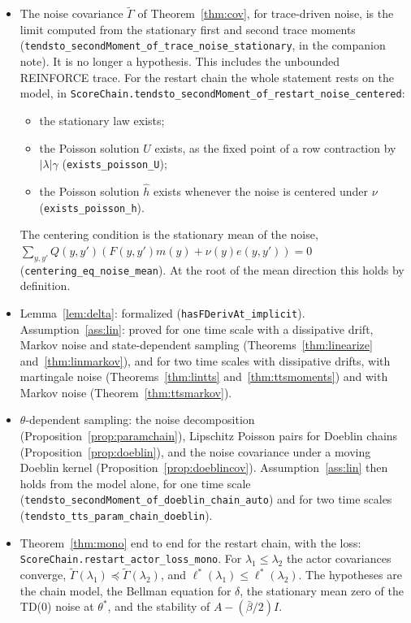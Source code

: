 \documentclass[11pt]{article}
\theoremstyle{definition}
\theoremstyle{remark}
\begin{document}
\begin{itemize}
  $|\lambda| \le 1$.
\item The noise covariance $\tilde\Gamma$ of Theorem~\ref{thm:cov}, for trace-driven noise, is the limit
  computed from the stationary first and second trace moments
  (\texttt{tendsto\_secondMoment\_of\_trace\_noise\_stationary}, in the companion note). It is no
  longer a hypothesis. This includes the unbounded REINFORCE trace. For the restart chain the
  whole statement rests on the model, in
  \texttt{ScoreChain.tendsto\_secondMoment\_of\_restart\_noise\_centered}:
  \begin{itemize}
  \item the stationary law exists;
  \item the Poisson solution $U$ exists, as the fixed point of a row contraction by $|\lambda|\gamma$
    (\texttt{exists\_poisson\_U});
  \item the Poisson solution $\hat h$ exists whenever the noise is centered under $\nu$
    (\texttt{exists\_poisson\_h}).
  \end{itemize}
  The centering condition is the stationary mean of the noise,
  $\sum_{y,y'}Q(y,y')(F(y,y')m(y) + \nu(y)e(y,y')) = 0$ (\texttt{centering\_eq\_noise\_mean}).
  At the root of the mean direction this holds by definition.
\item Lemma~\ref{lem:delta}: formalized (\texttt{hasFDerivAt\_implicit}). Assumption~\ref{ass:lin}:
  proved for one time scale with a dissipative drift, Markov noise and state-dependent sampling
  (Theorems~\ref{thm:linearize} and~\ref{thm:linmarkov}), and for two time scales with dissipative drifts,
  with martingale noise (Theorems~\ref{thm:lintts} and~\ref{thm:ttsmoments}) and with Markov
  noise (Theorem~\ref{thm:ttsmarkov}).
\item $\theta$-dependent sampling: the noise decomposition (Proposition~\ref{prop:paramchain}), Lipschitz
  Poisson pairs for Doeblin chains (Proposition~\ref{prop:doeblin}), and the noise covariance under a
  moving Doeblin kernel (Proposition~\ref{prop:doeblincov}). Assumption~\ref{ass:lin} then holds from
  the model alone, for one time scale (\texttt{tendsto\_secondMoment\_of\_doeblin\_chain\_auto}) and for two
  time scales (\texttt{tendsto\_tts\_param\_chain\_doeblin}).
\item Theorem~\ref{thm:mono} end to end for the restart chain, with the loss:
  \texttt{ScoreChain.restart\_actor\_loss\_mono}. For $\lambda_1 \le \lambda_2$ the actor covariances converge,
  $\tilde\Gamma(\lambda_1) \preceq \tilde\Gamma(\lambda_2)$, and $\ell^*(\lambda_1) \le \ell^*(\lambda_2)$. The hypotheses are the chain
  model, the Bellman equation for $\delta$, the stationary mean zero of the TD(0) noise at $\theta^*$, and
  the stability of $A - (\bar\beta/2)I$.
\end{itemize}
\end{document}
